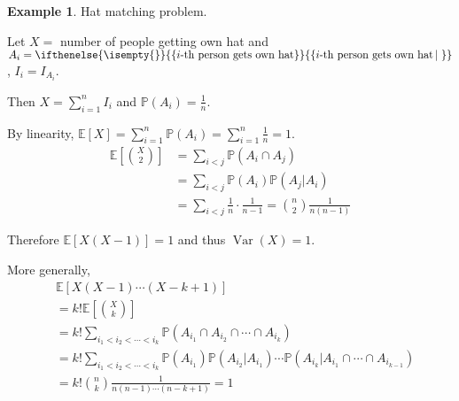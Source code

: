 \documentclass[a4paper,11pt]{amsbook}
\theoremstyle{definition}
\newtheorem{example}{\hspace{-2em} \color{darkblue} Example}[chapter]
\theoremstyle{remark}
\newcommand{\E}{\mathbb{E}}
\renewcommand{\P}{\mathbb{P}}
\DeclareMathOperator\Var{Var}
\newcommand\0{\varnothing}
\newcommand\set[2][]
{
    \ifthenelse{\isempty{#1}}
    {
        \left\{#2\right\}
    }
    {
        \left\{#2\left|\,#1\right.\right\}
    }
}
\begin{document}
    \begin{example}
        Hat matching problem. 
        
        Let $X=$ number of people getting own hat and 
        $A_i=\set{i\text{-th person gets own hat}}$, $I_i=I_{A_i}$.

        Then $X=\sum_{i=1}^nI_i$ and $\P(A_i)=\frac{1}{n}$.

        By linearity, $\E[X]=\sum_{i=1}^n\P(A_i)=\sum_{i=1}^{n}\frac{1}{n}=1$.
        \begin{align*}
            \E\left[\binom X2\right]&=\sum_{i<j}\P(A_i\cap A_j) \\
            &=\sum_{i<j}\P(A_i)\P(A_j|A_i) \\
            &=\sum_{i<j}\frac{1}{n}\cdot\frac{1}{n-1}=\binom n2\frac{1}{n(n-1)}
        \end{align*}

        Therefore $\E[X(X-1)]=1$ and thus $\Var(X)=1$.

        More generally,
        \begin{align*}
            &\E[X(X-1)\cdots(X-k+1)] \\
            &=k!\E\left[\binom Xk\right] \\
            &=k!\sum_{i_1<i_2<\cdots<i_k}\P(A_{i_1}\cap A_{i_2}\cap\cdots\cap A_{i_k}) \\
            &=k!\sum_{i_1<i_2<\cdots<i_k}\P(A_{i_1})\P(A_{i_2}|A_{i_1})\cdots\P(A_{i_k}|A_{i_1}\cap\cdots\cap A_{i_{k-1}}) \\
            &=k!\binom nk\frac{1}{n(n-1)\cdots(n-k+1)}=1
        \end{align*}
    \end{example}
\end{document}
